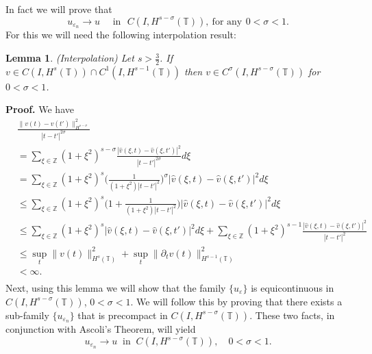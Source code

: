 \documentclass[12pt,reqno]{amsart}
\newcommand{\zz}{\mathbb{Z}}
\newcommand{\ci}{\mathbb{T}}
\newcommand{\ee}{\varepsilon}
\theoremstyle{plain}  %
\newtheorem{lemma}{Lemma}
\theoremstyle{definition}
\begin{document}
\begin{appendices}
		In fact we will prove that 
		\begin{equation}
			\label{strong-conv}
			u_{\ee_n}\longrightarrow u
			\quad
			\text{ in } \,\,   C(I, H^{s-\sigma}(\ci)),\ \text{for any} \
			\, 0 < \sigma <
			1.
		\end{equation}
		For this we will need the following interpolation  result:
		\begin{lemma}
			\label{interpolation-lem}
			(Interpolation)     Let  $s > \frac{3}{2}$.
			If $v \in C(I, H^s(\ci)) \cap C^1(I, H^{s-1}(\ci))$
			then $v \in C^\sigma (I, H^{s- \sigma}(\ci))$ for  $0 < \sigma < 1$.
		\end{lemma}
		{\bf Proof.}  We have
		\begin{equation*}
			\begin{split}
				& \frac{\|v(t) - v(t')\|^2_{H^{s - \sigma}}}{|t - t'|^{2\sigma}}
				\\
				& = 
				\sum_{\xi \in \zz} (1 + \xi^2)^{s- \sigma} 
				\frac{|\hat{v}(\xi, t) - \hat{v}(\xi, t')|^2}{|t-t'|^{2\sigma}} d\xi\\
				& = \sum_{\xi \in \zz} (1+\xi^2)^s 
				\bigg(\frac{1}{(1+ \xi^2)|t - t'|^2} \bigg)^\sigma |\hat{v}(\xi, t)- \hat{v}(\xi, t')|^2 d\xi\\
				& \leq \sum_{\xi \in \zz}(1+\xi^2)^s \bigg( 1 + \frac{1}{(1+\xi^2)|t-t'|^2} \bigg)
				|\hat{v}(\xi,t) - \hat{v}(\xi,t')|^2 d\xi \\
				& \leq \sum_{\xi \in \zz} (1+ \xi^2)^s |\hat{v}(\xi, t)- \hat{v}(\xi, t')|^2 d\xi
				+ \sum_{\xi \in \zz} (1+ \xi^2)^{s-1} \frac{|\hat{v}(\xi, t) - \hat{v} (\xi, t')|^2}{|t-t'|^2} \\
				& \leq  \sup_t \|v(t)\|_{H^s(\ci)}^2 + \sup_t
				\| \partial_t v(t) \|_{H^{s-1}(\ci)}^2
				\\
				& < \infty.
				\\
			\end{split}
		\end{equation*}
		\vskip0.1in
		Next, using this lemma we will show that the family $\{u_\ee\}$ is
		equicontinuous in $C(I, H^{s-\sigma}(\ci))$, $0 < \sigma < 1$. We
		will follow this by proving that there exists a sub-family
		$\{u_{\ee_n} \}$ that is precompact in $C(I,
		H^{s-\sigma}(\ci))$. These two facts, in conjunction with Ascoli's
		Theorem, will yield
		\begin{equation}
			\label{strong-conv2}
			u_{\ee_n} \to u \; \; \text{in} \; \; C(I,H^{s-\sigma}(\ci)),
			\quad
			0 < \sigma < 1.
		\end{equation}


\end{appendices}
\end{document}
